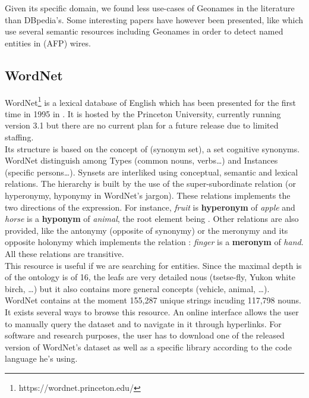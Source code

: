 Given its specific domain, we found less use-cases of Geonames in the literature than DBpedia's. Some interesting papers have however been presented, like \cite{stern2010detection} which use several semantic resources including Geonames in order to detect named entities in  (AFP) wires.

\subsection{WordNet} %
\label{sub:wordnet}

WordNet\footnote{https://wordnet.princeton.edu/} is a lexical database of English which has been presented for the first time in 1995 in \cite{miller1995wordnet}. It is hosted by the Princeton University, currently running version 3.1 but there are no current plan for a future release due to limited staffing.\\

Its structure is based on the concept of  (synonym set), a set cognitive synonyms. WordNet distinguish among Types (common nouns, verbs\dots) and Instances (specific persons\dots). Synsets are interliked using conceptual, semantic and lexical relations. The hierarchy is built by the use of the super-subordinate relation (or hyperonymy, hyponymy in WordNet's jargon). These relations implements the two directions of the  expression. For instance, \textit{fruit} is \textbf{hyperonym} of \textit{apple} and \textit{horse} is a \textbf{hyponym} of \textit{animal}, the root element being . Other relations are also provided, like the antonymy (opposite of synonymy) or the meronymy and its opposite holonymy which implements the  relation : \textit{finger} is a \textbf{meronym} of \textit{hand}. All these relations are transitive.\\

This resource is useful if we are searching for entities. Since the maximal depth is of the ontology is of 16, the leafs are very detailed nous (tsetse-fly, Yukon white birch, \dots) but it also contains more general concepts (vehicle, animal, \dots). WordNet contains at the moment 155,287 unique strings incuding 117,798 nouns.\\ 

It exists several ways to browse this resource. An online interface allows the user to manually query the dataset and to navigate in it through hyperlinks. For software and research purposes, the user has to download one of the released version of WordNet's dataset as well as a specific library according to the code language he's using.\\

